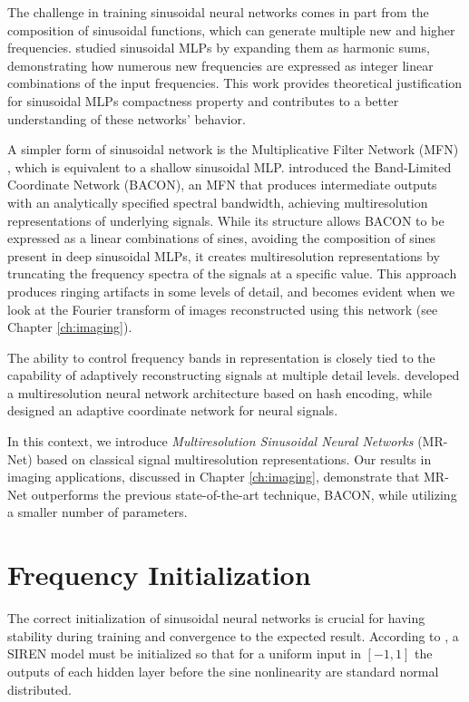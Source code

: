 The challenge in training sinusoidal neural networks comes in part from the composition of sinusoidal functions, which can generate multiple new and higher frequencies. \cite{novello2022understanding} studied sinusoidal MLPs by expanding them as harmonic sums, demonstrating how numerous new frequencies are expressed as integer linear combinations of the input frequencies. This work provides theoretical justification for sinusoidal MLPs compactness property and contributes to a better understanding of these networks’ behavior.

A simpler form of sinusoidal network is the Multiplicative Filter Network (MFN) \cite{fathony2020multiplicative}, which is equivalent to a shallow sinusoidal MLP. \cite{bacon2021} introduced the Band-Limited Coordinate Network (BACON), an MFN that produces intermediate outputs with an analytically specified spectral bandwidth, achieving multiresolution representations of underlying signals. While its structure allows BACON to be expressed as a linear combinations of sines, avoiding the composition of sines present in deep sinusoidal MLPs, it creates multiresolution representations by truncating the frequency spectra of the signals at a specific value. This approach produces ringing artifacts in some levels of detail, and becomes evident when we look at the Fourier transform of images reconstructed using this network (see Chapter \ref{ch:imaging}).

The ability to control frequency bands in representation is closely tied to the capability of adaptively reconstructing signals at multiple detail levels. \citet{mueller2022instant} developed a multiresolution neural network architecture based on hash encoding, while \citet{martel2021acorn} designed an adaptive coordinate network for neural signals.

In this context, we introduce \textit{Multiresolution Sinusoidal Neural Networks} (MR-Net) \cite{paz2022,paz2023mr} based on classical signal multiresolution representations. Our results in imaging applications, discussed in Chapter \ref{ch:imaging}, demonstrate that MR-Net outperforms the previous state-of-the-art technique, BACON, while utilizing a smaller number of parameters.


\section{Frequency Initialization}

The correct initialization of sinusoidal neural networks is crucial for having stability during training and convergence to the expected result. According to \cite{sitzmann2019siren}, a SIREN model must be initialized so that for a uniform input in $[-1, 1]$ the outputs of each hidden layer before the sine nonlinearity are standard normal distributed. 


